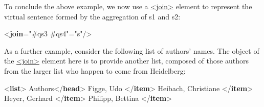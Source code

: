  To conclude the above example, we now use a \hyperref[TEI.join]{<join>} element to represent the virtual sentence formed by the aggregation of s1 and s2: \par\bgroup{}\exampleFont \begin{shaded}\noindent\mbox{}{<\textbf{join}\hspace*{1em}{target}="{\#qs3 \#qs4}"\hspace*{1em}{result}="{s}"/>}\end{shaded}\egroup\par \noindent  As a further example, consider the following list of authors' names. The object of the \hyperref[TEI.join]{<join>} element here is to provide another list, composed of those authors from the larger list who happen to come from Heidelberg: \par\bgroup{}\exampleFont \begin{shaded}\noindent\mbox{}{<\textbf{list}>}\mbox{}\newline 
{}Authors{</\textbf{head}>}\mbox{}\newline 
{}Figge, Udo {</\textbf{item}>}\mbox{}\newline 
{}Heibach, Christiane {</\textbf{item}>}\mbox{}\newline 
{}Heyer, Gerhard {</\textbf{item}>}\mbox{}\newline 
{}Philipp, Bettina {</\textbf{item}>}\mbox{}\newline 

\end{shaded}
